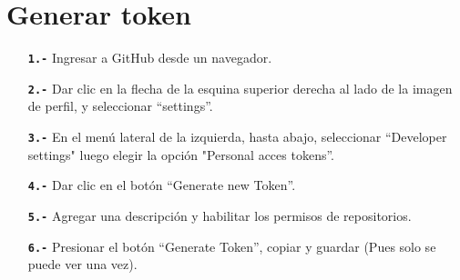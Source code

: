 \section{Generar token}
\begin{itemize}
	\item[\textbf{\texttt{1.-}}] Ingresar a GitHub desde un navegador.
	\item[\textbf{\texttt{2.-}}] Dar clic en la flecha de la esquina superior derecha al lado de la imagen de perfil, y seleccionar ``settings''.
	\item[\textbf{\texttt{3.-}}] En el menú lateral de la izquierda, hasta abajo, seleccionar ``Developer settings" luego elegir la opción "Personal acces tokens''.
	\item[\textbf{\texttt{4.-}}] Dar clic en el botón ``Generate new Token''.
	\item[\textbf{\texttt{5.-}}] Agregar una descripción y habilitar los permisos de repositorios.
	\item[\textbf{\texttt{6.-}}] Presionar el botón ``Generate Token'', copiar y guardar (Pues solo se puede ver una vez).
\end{itemize}	
